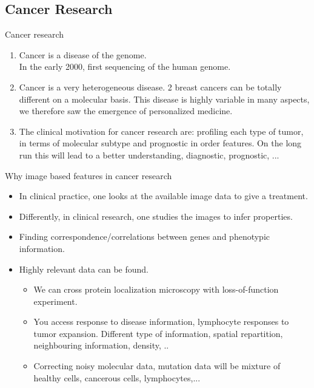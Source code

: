 \documentclass{beamer}
\begin{document}
\subsection{Cancer Research}
\begin{frame}{Cancer research}
\begin{enumerate}
\item Cancer is a disease of the genome. \\ 
In the early 2000, first sequencing of the human genome.
\item Cancer is a very heterogeneous disease. 2 breast cancers can be totally different on a molecular basis. This disease is highly variable in many aspects, we therefore saw the emergence of personalized medicine. 
\item The clinical motivation for cancer research are: profiling each type of tumor, in terms of molecular subtype and prognostic in order features. On the long run this will lead to a better understanding, diagnostic, prognostic, ...
\end{enumerate}
\end{frame}

\begin{frame}{Why image based features in cancer research}
\begin{itemize}
\item In clinical practice, one looks at the available image data to give a treatment. 
\item Differently, in clinical research, one studies the images to infer properties.
\item Finding correspondence/correlations between genes and phenotypic information. 
\item Highly relevant data can be found. \\
\begin{itemize}
\item We can cross protein localization microscopy with loss-of-function experiment.
\item You access response to disease information, lymphocyte responses to tumor expansion. Different type of information, spatial repartition, neighbouring information, density, ..
\item Correcting noisy molecular data, mutation data will be mixture of healthy cells, cancerous cells, lymphocytes,...
\end{itemize}
\end{itemize}
\end{frame}
\end{document}
